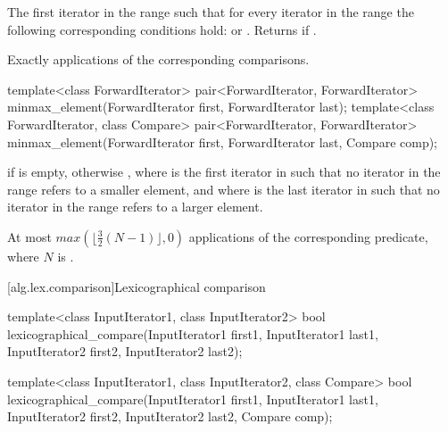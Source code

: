 \begin{itemdescr}
\pnum
\returns
The first iterator
in the range
such that for every iterator
in the range
the following corresponding conditions hold:
or
.
Returns
if
.

\pnum
\complexity
Exactly
applications of the corresponding comparisons.
\end{itemdescr}

%
\begin{itemdecl}
template<class ForwardIterator>
  pair<ForwardIterator, ForwardIterator>
    minmax_element(ForwardIterator first, ForwardIterator last);
template<class ForwardIterator, class Compare>
  pair<ForwardIterator, ForwardIterator>
    minmax_element(ForwardIterator first, ForwardIterator last, Compare comp);
\end{itemdecl}


\begin{itemdescr}
\pnum
\returns
{} if  is empty, otherwise
, where  is
the first iterator in  such that no iterator in the range refers to a smaller element, and where  is the last iterator in  such that no iterator in the range refers to a larger element.

\pnum
\complexity
At most
$max(\lfloor{\frac{3}{2}} (N-1)\rfloor, 0)$
applications of the corresponding predicate, where $N$ is .
\end{itemdescr}

[alg.lex.comparison]{Lexicographical comparison}

%
\begin{itemdecl}
template<class InputIterator1, class InputIterator2>
  bool
    lexicographical_compare(InputIterator1 first1, InputIterator1 last1,
                            InputIterator2 first2, InputIterator2 last2);

template<class InputIterator1, class InputIterator2, class Compare>
  bool
    lexicographical_compare(InputIterator1 first1, InputIterator1 last1,
                            InputIterator2 first2, InputIterator2 last2,
                            Compare comp);
\end{itemdecl}


